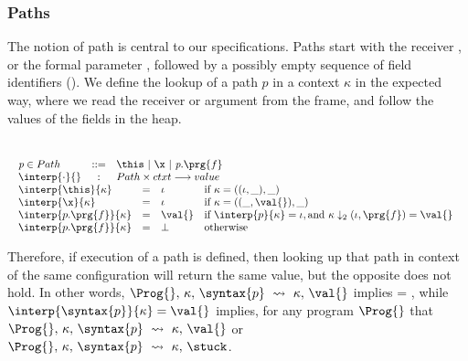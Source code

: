\subsubsection{Paths}

The notion of path is central to our specifications. Paths %
start with the receiver \this, or the formal parameter \x, followed by
a possibly empty sequence of field identifiers (). We define
the lookup of a path $p$ in a context $\kappa$ in the expected way,
where we read the receiver or argument from the frame, and follow the
values of the fields in the heap.


\begin{definition}
\label{def:paths}
~ \\

$
\begin{array}{l}
\begin{array}{lcl}
 \textit{p}  \in Path & ::= & \this  \  | \ \x \  |  \  \textit{p}.\prg{f}
 \\
  \interp{\cdot} {}  & : &  Path \times ctxt \longrightarrow  value
\\
 \end{array}
 \\
\begin{array}{lcll}
\interp{\this}{\kappa}  & =  & \iota & \mbox{if}\ \kappa=((\iota,\_), \_) \\
\interp{\x}{\kappa}  & =  & \iota & \mbox{if}\ \kappa=((\_,\val{}), \_) \\
\interp{p.\prg{f}}{\kappa}  & =  & \val{} & \mbox{if}\  \interp{p}{\kappa}=\iota,  \mbox{and }   \kappa\downarrow_2(\iota,\prg{f})=\val{}\ \\
\interp{p.\prg{f}}{\kappa}  & =  & \bot & \mbox{otherwise}\ \\
\end{array}
\end{array}
$
\end{definition}


Therefore, if  execution of a path is defined, then looking up that path in context of the same configuration will return the same value, but the opposite does not hold. In other words,  $ \Prog{},\, \kappa,\, \syntax{p} \ \leadsto\  \kappa,\, \val{}$ implies  = \val{}, while $\interp{\syntax{p}}{\kappa} = \val{}$ implies, for any program $\Prog{}$ that $ \Prog{},\, \kappa,\, \syntax{p} \ \leadsto\  \kappa,\, \val{}$  or $ \Prog{},\, \kappa,\, \syntax{p} \ \leadsto\  \kappa,\, \stuck$.



